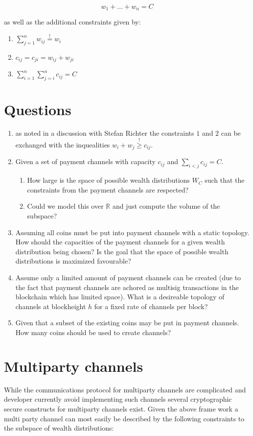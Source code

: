 \documentclass[10pt,twocolumn]{article}
\begin{document}
$$w_1 + \dots + w_n = C $$

as well as the additional constraints given by:
\begin{enumerate}
\item $\sum_{j=1}^nw_{ij}\stackrel{!}{=}w_i$
\item $c_{ij}=c_{ji} = w_{ij} + w_{ji}$
\item $\sum_{i=1}^n\sum_{j=i}^nc_{ij}  = C$
\end{enumerate}
\section{Questions}
\begin{enumerate}
\item as noted in a discussion with Stefan Richter the constraints $1$ and $2$ can be exchanged with the inquealities $w_i + w_j \stackrel{!}{\geq} c_{ij}$.
\item Given a set of payment channels with capacity $c_{ij}$ and $\sum_{i<j} c_{ij} = C$. \begin{enumerate}\item How large is the space of possible wealth distributions $W_C$ such that the constraints from the payment channels are respected?
\item Could we model this over $\mathbb{R}$ and just compute the volume of the subspace?\end{enumerate}
\item Assuming all coins must be put into payment channels with a static topology. How should the capacities of the payment channels for a given wealth distribution being chosen? Is the goal that the space of possible wealth distributions is maximized favourable? 
\item Assume only a limited amount of payment channels can be created (due to the fact that payment channels are achored as multisig transactions in the blockchain which has limited space). What is a desireable topology of channels at blockheight $h$ for a fixed rate of channels per block?
\item Given that a subset of the existing coins may be put in payment channels. How many coins should be used to create channels?
\end{enumerate}

\section{Multiparty channels}
While the communications protocol for multiparty channels are complicated and developer currently avoid implementing such channels several cryptographic secure constructs for multiparty channels exist.
Given the above frame work a multi party channel can most easily be described by the following constraints to the subspace of wealth distributions:
\end{document}

